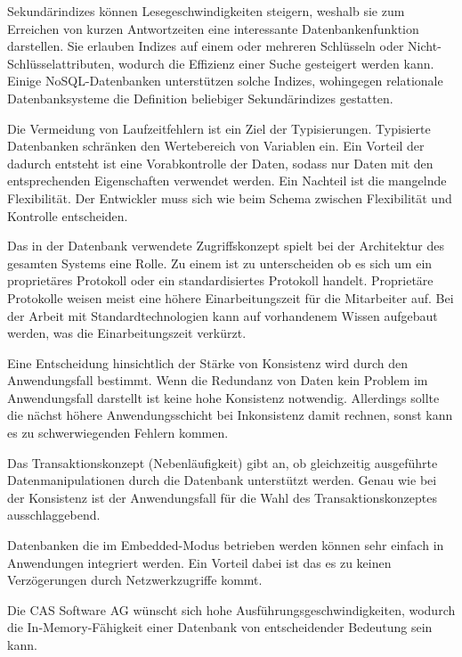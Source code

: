 Sekundärindizes können Lesegeschwindigkeiten steigern, weshalb sie zum Erreichen von kurzen Antwortzeiten eine interessante Datenbankenfunktion darstellen. Sie erlauben Indizes auf einem oder mehreren Schlüsseln oder Nicht-Schlüsselattributen, wodurch die Effizienz einer Suche gesteigert werden kann. Einige NoSQL-Datenbanken unterstützen solche Indizes, wohingegen relationale Datenbanksysteme die Definition beliebiger Sekundärindizes gestatten. 

Die Vermeidung von Laufzeitfehlern ist ein Ziel der Typisierungen. Typisierte Datenbanken schränken den Wertebereich von Variablen ein. Ein Vorteil der dadurch entsteht ist eine Vorabkontrolle der Daten, sodass nur Daten mit den entsprechenden Eigenschaften verwendet werden. Ein Nachteil ist die mangelnde Flexibilität. Der Entwickler muss sich wie beim Schema zwischen Flexibilität und Kontrolle entscheiden. 

Das in der Datenbank verwendete Zugriffskonzept spielt bei der Architektur des gesamten Systems eine Rolle. Zu einem ist zu unterscheiden ob es sich um ein proprietäres Protokoll oder ein standardisiertes Protokoll handelt. Proprietäre Protokolle weisen meist eine höhere Einarbeitungszeit für die Mitarbeiter auf. Bei der Arbeit mit Standardtechnologien kann auf vorhandenem Wissen aufgebaut werden, was die Einarbeitungszeit verkürzt. 

Eine Entscheidung hinsichtlich der Stärke von Konsistenz wird durch den Anwendungsfall bestimmt. Wenn die Redundanz von Daten kein Problem im Anwendungsfall darstellt ist keine hohe Konsistenz notwendig. Allerdings sollte die nächst höhere Anwendungsschicht bei Inkonsistenz damit rechnen, sonst kann es zu schwerwiegenden Fehlern kommen. 

Das Transaktionskonzept (Nebenläufigkeit) gibt an, ob gleichzeitig ausgeführte Datenmanipulationen durch die Datenbank unterstützt werden. Genau wie bei der Konsistenz ist der Anwendungsfall für die Wahl des Transaktionskonzeptes ausschlaggebend.   

Datenbanken die im Embedded-Modus betrieben werden können sehr einfach in Anwendungen integriert werden. Ein Vorteil dabei ist das es zu keinen Verzögerungen durch Netzwerkzugriffe kommt. 


Die CAS Software AG wünscht sich hohe Ausführungsgeschwindigkeiten, wodurch die In-Memory-Fähigkeit einer Datenbank von entscheidender Bedeutung sein kann.

